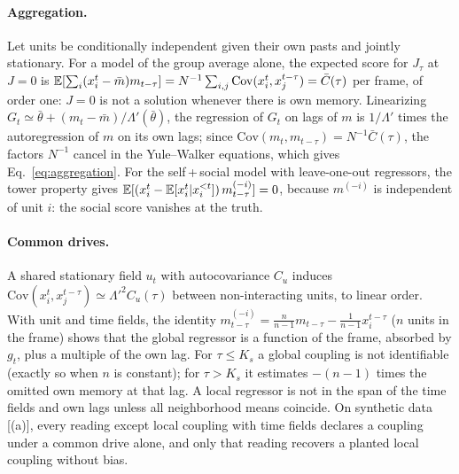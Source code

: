 \paragraph{Aggregation.} Let units be conditionally independent given their own pasts and jointly stationary. For a model of the group average alone, the expected score for $J_\tau$ at $J=0$ is $\mathbb{E}[\sum_i(x_i^t-\bar m)m_{t-\tau}]=N^{-1}\sum_{i,j}\mathrm{Cov}(x_i^t,x_j^{t-\tau})=\bar C(\tau)$ per frame, of order one: $J=0$ is not a solution whenever there is own memory. Linearizing $G_t\simeq\bar\theta+(m_t-\bar m)/\Lambda'(\bar\theta)$, the regression of $G_t$ on lags of $m$ is $1/\Lambda'$ times the autoregression of $m$ on its own lags; since $\mathrm{Cov}(m_t,m_{t-\tau})=N^{-1}\bar C(\tau)$, the factors $N^{-1}$ cancel in the Yule--Walker equations, which gives Eq.~\eqref{eq:aggregation}. For the self\,+\,social model with leave-one-out regressors, the tower property gives $\mathbb{E}[(x_i^t-\mathbb{E}[x_i^t|x_i^{<t}])\,m^{(-i)}_{t-\tau}]=0$, because $m^{(-i)}$ is independent of unit $i$: the social score vanishes at the truth.

\paragraph{Common drives.} A shared stationary field $u_t$ with autocovariance $C_u$ induces $\mathrm{Cov}(x_i^t,x_j^{t-\tau})\simeq\Lambda'^2C_u(\tau)$ between non-interacting units, to linear order. With unit and time fields, the identity $m^{(-i)}_{t-\tau}=\frac{n}{n-1}m_{t-\tau}-\frac1{n-1}x_i^{t-\tau}$ ($n$ units in the frame) shows that the global regressor is a function of the frame, absorbed by $g_t$, plus a multiple of the own lag. For $\tau\le K_s$ a global coupling is not identifiable (exactly so when $n$ is constant); for $\tau>K_s$ it estimates $-(n-1)$ times the omitted own memory at that lag. A local regressor is not in the span of the time fields and own lags unless all neighborhood means coincide. On synthetic data [(a)], every reading except local coupling with time fields declares a coupling under a common drive alone, and only that reading recovers a planted local coupling without bias.

